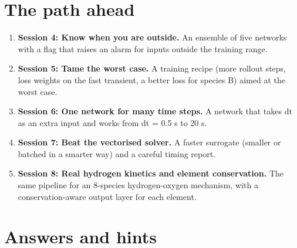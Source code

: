 \documentclass[11pt,a4paper]{article}
\begin{document}
\section{The path ahead}
\begin{enumerate}[nosep]
\item \textbf{Session 4: Know when you are outside.} An ensemble of five networks with a flag that raises an alarm for inputs outside the training range.
\item \textbf{Session 5: Tame the worst case.} A training recipe (more rollout steps, loss weights on the fast transient, a better loss for species B) aimed at the worst case.
\item \textbf{Session 6: One network for many time steps.} A network that takes dt as an extra input and works from dt = 0.5 s to 20 s.
\item \textbf{Session 7: Beat the vectorised solver.} A faster surrogate (smaller or batched in a smarter way) and a careful timing report.
\item \textbf{Session 8: Real hydrogen kinetics and element conservation.} The same pipeline for an 8-species hydrogen-oxygen mechanism, with a conservation-aware output layer for each element.
\end{enumerate}

\section{Answers and hints}
\end{document}
